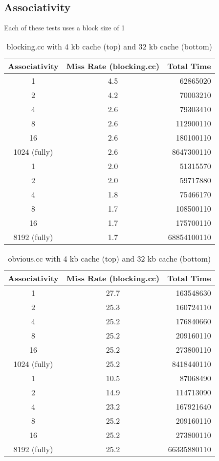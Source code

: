 \documentclass[letterpaper, 12pt, oneside]{memoir}
\begin{document}
\subsection{Associativity}
Each of these tests uses a block size of 1

\begin{table}[H]
\centering
\begin{tabular}{c|c|r}
    Associativity & Miss Rate (blocking.cc) & Total Time \\ \hline
    1           & 4.5   & 62865020 \\
    2           & 4.2   & 70003210 \\
    4           & 2.6   & 79303410 \\
    8           & 2.6   & 112900110 \\
    16          & 2.6   & 180100110 \\
    1024 (fully) & 2.6   & 8647300110 \\ \hline
    1           & 2.0   & 51315570 \\
    2           & 2.0   & 59717880 \\
    4           & 1.8   & 75466170 \\
    8           & 1.7   & 108500110 \\
    16          & 1.7   & 175700110 \\
    8192 (fully) & 1.7  & 68854100110 \\
\end{tabular}
\caption{blocking.cc with 4 kb cache (top) and 32 kb cache (bottom)}
\end{table}

\begin{table}[H]
\centering
\begin{tabular}{c|c|r}
    Associativity & Miss Rate (blocking.cc) & Total Time \\ \hline
    1           & 27.7  & 163548630 \\
    2           & 25.3  & 160724110 \\
    4           & 25.2  & 176840660 \\
    8           & 25.2  & 209160110 \\
    16          & 25.2  & 273800110 \\
    1024 (fully) & 25.2  & 8418440110 \\ \hline
    1           & 10.5  & 87068490 \\
    2           & 14.9  & 114713090 \\
    4           & 23.2  & 167921640 \\
    8           & 25.2  & 209160110 \\
    16          & 25.2  & 273800110 \\
    8192 (fully) & 25.2 & 66335880110 \\
\end{tabular}
\caption{obvious.cc with 4 kb cache (top) and 32 kb cache (bottom)}
\end{table}
\end{document}
